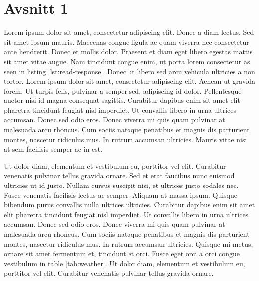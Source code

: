 \documentclass[12pt]{article}
\begin{document}
\section{Avsnitt 1}
\label{sec-1}
Lorem ipsum dolor sit amet, consectetur adipiscing elit. Donec a diam lectus. Sed sit amet ipsum mauris. Maecenas congue ligula ac quam viverra nec consectetur ante hendrerit. Donec et mollis dolor. Praesent et diam eget libero egestas mattis sit amet vitae augue. Nam tincidunt congue enim, ut porta lorem consectetur as seen in listing \ref{lst:read-response}. Donec ut libero sed arcu vehicula ultricies a non tortor. Lorem ipsum dolor sit amet, consectetur adipiscing elit. Aenean ut gravida lorem. Ut turpis felis, pulvinar a semper sed, adipiscing id dolor. Pellentesque auctor nisi id magna consequat sagittis. Curabitur dapibus enim sit amet elit pharetra tincidunt feugiat nisl imperdiet. Ut convallis libero in urna ultrices accumsan. Donec sed odio eros. Donec viverra mi quis quam pulvinar at malesuada arcu rhoncus. Cum sociis natoque penatibus et magnis dis parturient montes, nascetur ridiculus mus. In rutrum accumsan ultricies. Mauris vitae nisi at sem facilisis semper ac in est.

\begin{code}
\end{code}



Ut dolor diam, elementum et vestibulum eu, porttitor vel elit. Curabitur venenatis pulvinar tellus gravida ornare. Sed et erat faucibus nunc euismod ultricies ut id justo. Nullam cursus suscipit nisi, et ultrices justo sodales nec. Fusce venenatis facilisis lectus ac semper. Aliquam at massa ipsum. Quisque bibendum purus convallis nulla ultrices ultricies. Curabitur dapibus enim sit amet elit pharetra tincidunt feugiat nisl imperdiet. Ut convallis libero in urna ultrices accumsan. Donec sed odio eros. Donec viverra mi quis quam pulvinar at malesuada arcu rhoncus. Cum sociis natoque penatibus et magnis dis parturient montes, nascetur ridiculus mus. In rutrum accumsan ultricies. Quisque mi metus, ornare sit amet fermentum et, tincidunt et orci. Fusce eget orci a orci congue vestibulum in table \ref{tab:weather}. Ut dolor diam, elementum et vestibulum eu, porttitor vel elit. Curabitur venenatis pulvinar tellus gravida ornare.
\end{document}
